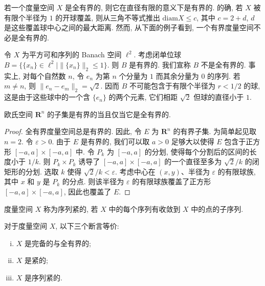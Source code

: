 \documentclass[../../main.tex]{subfiles}
\begin{document}
若一个度量空间 $X$ 是全有界的, 则它在直径有限的意义下是有界的. 的确, 若 $X$ 被有限个半径为 $1$ 的开球覆盖, 则从三角不等式推出 $\mathrm{diam}X\leqslant c$, 其中 $c=2+d$, $d$ 是这些覆盖球中心之间的最大距离. 然而, 从下面的例子看到, 一个有界度量空间不必是全有界的.

\begin{example}\label{example:ch09-l2单位球不全有界}
令 $X$ 为平方可和序列的 Banach 空间 $\ell^{2}$. 考虑闭单位球 $B=\{\{x_{n}\}\in\ell^{2}\mid\|\{x_{n}\}\|_{2}\leqslant 1\}$. 则 $B$ 是有界的. 我们宣称 $B$ 不是全有界的. 事实上, 对每个自然数 $n$, 令 $e_{n}$ 为第 $n$ 个分量为 $1$ 而其余分量为 $0$ 的序列. 若 $m\neq n$, 则 $\|e_{n}-e_{m}\|_{2}=\sqrt{2}$. 因而 $B$ 不可能包含于有限个半径为 $r<1/2$ 的球, 这是由于这些球中的一个含 $\{e_{n}\}$ 的两个元素, 它们相距 $\sqrt{2}$ 但球的直径小于 $1$.
\end{example}

\begin{proposition}\label{proposition:ch09-Rn有界全有界}
欧氏空间 $\mathbf{R}^{n}$ 的子集是有界的当且仅当它是全有界的.
\end{proposition}

\begin{proof}
全有界度量空间总是有界的. 因此, 令 $E$ 为 $\mathbf{R}^{n}$ 的有界子集. 为简单起见取 $n=2$. 令 $\varepsilon>0$. 由于 $E$ 是有界的, 我们可以取 $a>0$ 足够大以使得 $E$ 包含于正方形 $[-a,a]\times[-a,a]$ 中. 令 $P_{k}$ 为 $[-a,a]$ 的分划, 使得每个分割后的区间的长度小于 $1/k$. 则 $P_{k}\times P_{k}$ 诱导了 $[-a,a]\times[-a,a]$ 的一个直径至多为 $\sqrt{2}/k$ 的闭矩形的分划. 选取 $k$ 使得 $\sqrt{2}/k<\varepsilon$. 考虑中心在 $(x,y)$、半径为 $\varepsilon$ 的有限球族, 其中 $x$ 和 $y$ 是 $P_{k}$ 的分点. 则该半径为 $\varepsilon$ 的有限球族覆盖了正方形 $[-a,a]\times[-a,a]$, 因此也覆盖了 $E$.
\end{proof}

\begin{definition}[序列紧]\label{definition:ch09-序列紧}
度量空间 $X$ 称为序列紧的, 若 $X$ 中的每个序列有收敛到 $X$ 中的点的子序列.
\end{definition}

\begin{theorem}[紧性的刻画]\label{theorem:ch09-紧性刻画}
对于度量空间 $X$, 以下三个断言等价:
\begin{enumerate}[(i)]
\item $X$ 是完备的与全有界的;
\item $X$ 是紧的;
\item $X$ 是序列紧的.
\end{enumerate}
\end{theorem}
\end{document}
